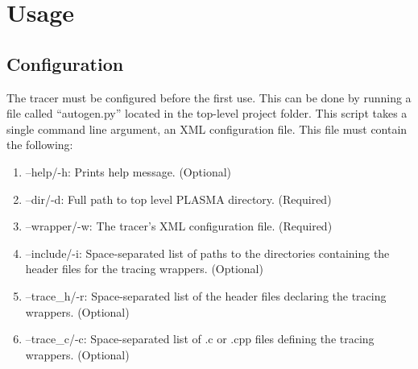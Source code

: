 \documentclass{article}
\begin{document}
\section{Usage}
\subsection{Configuration}
The tracer must be configured before the first use. This can be done by running a file called ``autogen.py'' located in the top-level project folder. This script takes a single command line argument, an XML configuration file. This file must contain the following:

\begin{enumerate}
\item{} --help/-h: Prints help message. (Optional)
\item{} --dir/-d: Full path to top level PLASMA directory. (Required)
\item{} --wrapper/-w: The tracer's XML configuration file. (Required)
\item{} --include/-i: Space-separated list of paths to the directories containing the header files for the tracing wrappers. (Optional)
\item{} --trace\_h/-r: Space-separated list of the header files declaring the tracing wrappers. (Optional)
\item{} --trace\_c/-c: Space-separated list of .c or .cpp files defining the tracing wrappers. (Optional)
\end{enumerate}
\end{document}

